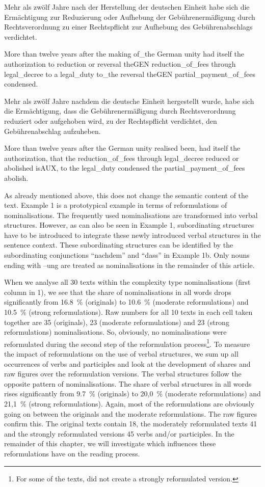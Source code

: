 \documentclass[output=paper]{langsci/langscibook}
\begin{document}
Mehr als zwölf Jahre nach der Herstellung der deutschen Einheit habe sich die Ermächtigung zur Reduzierung oder Aufhebung der Gebührenermäßigung durch Rechtsverordnung zu einer Rechtspflicht zur Aufhebung des Gebührenabschlags verdichtet.

More than twelve years after the making of\_the German unity had itself the authorization to reduction or reversal theGEN reduction\_of\_fees through legal\_decree to a legal\_duty to\_the reversal theGEN partial\_payment\_of\_fees condensed.

Mehr als zwölf Jahre nachdem die deutsche Einheit hergestellt wurde, habe sich die Ermächtigung, dass die Gebührenermäßigung durch Rechtsverordnung reduziert oder aufgehoben wird, zu der Rechtspflicht   verdichtet, den Gebührenabschlag aufzuheben.

More than twelve years after the German unity   realised been, had itself the authorization, that the reduction\_of\_fees through legal\_decree reduced or abolished isAUX, to the legal\_duty condensed the partial\_payment\_of\_fees abolish.

As already mentioned above, this does not change the semantic content of the text. Example 1 is a prototypical example in terms of reformulations of nominalisations. The frequently used nominalisations are transformed into verbal structures. However, as can also be seen in Example 1, subordinating structures have to be introduced to integrate these newly introduced verbal structures in the sentence context. These subordinating structures can be identified by the subordinating conjunctions “nachdem” and “dass” in Example 1b. Only nouns ending with –ung are treated as nominalisations in the remainder of this article.

When we analyse all 30 texts within the complexity type nominalisations (first column in 1), we see that the share of nominalisations in all words drops significantly from 16.8~\% (originals) to 10.6~\% (moderate reformulations) and 10.5~\% (strong reformulations). Raw numbers for all 10 texts in each cell taken together are 35 (originals), 23 (moderate reformulations) and 23 (strong reformulations) nominalisations. So, obviously, no nominalisations were reformulated during the second step of the reformulation process\footnote{For some of the texts, \citet{Hansen2006} did not create a strongly reformulated version.}. To measure the impact of reformulations on the use of verbal structures, we sum up all occurrences of verbs and participles and look at the development of shares and raw figures over the reformulation versions. The verbal structures follow the opposite pattern of nominalisations. The share of verbal structures in all words rises significantly from 9.7~\% (originals) to 20,0~\% (moderate reformulations) and 21,1~\% (strong reformulations). Again, most of the reformulations are obviously going on between the originals and the moderate reformulations. The raw figures confirm this. The original texts contain 18, the moderately reformulated texts 41 and the strongly reformulated versions 45 verbs and/or participles. In the remainder of this chapter, we will investigate which influences these reformulations have on the reading process.
\end{document}
